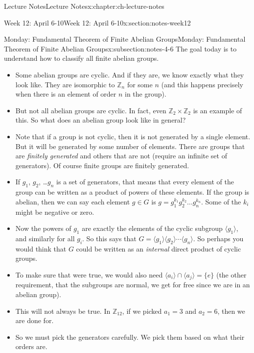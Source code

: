 \documentclass[oneside,11pt,]{book}
\begin{document}
\begin{chapterptx}{Lecture Notes}{}{Lecture Notes}{}{}{x:chapter:ch-lecture-notes}
\begin{sectionptx}{Week 12: April 6-10}{}{Week 12: April 6-10}{}{}{x:section:notes-week12}
%
%
\typeout{************************************************}
\typeout{************************************************}
%
\begin{subsectionptx}{Monday: Fundamental Theorem of Finite Abelian Groups}{}{Monday: Fundamental Theorem of Finite Abelian Groups}{}{}{x:subsection:notes-4-6}
The goal today is to understand how to classify all finite abelian groups.%
\par
%
\begin{itemize}[label=\textbullet]
\item{}Some abelian groups are cyclic. And if they are, we know exactly what they look like. They are isomorphic to \(\mathbb Z_{n}\) for some \(n\) (and this happens precisely when there is an element of order \(n\) in the group).%
\item{}But not all abelian groups are cyclic. In fact, even \(\mathbb Z_2\times \mathbb Z_2\) is an example of this. So what does an abelian group look like in general?%
\item{}Note that if a group is not cyclic, then it is not generated by a single element. But it will be generated by some number of elements. There are groups that are \emph{finitely generated} and others that are not (require an infinite set of generators). Of course finite groups are finitely generated.%
\item{}If \(g_1\), \(g_2\), …\(g_n\) is a set of generators, that means that every element of the group can be written as a product of powers of these elements. If the group is abelian, then we can say each element \(g \in G\) is \(g = g_1^{k_1}g_2^{k_2}\ldots g_n^{k_n}\). Some of the \(k_i\) might be negative or zero.%
\item{}Now the powers of \(g_1\) are exactly the elements of the cyclic subgroup \(\langle g_1\rangle\), and similarly for all \(g_i\). So this says that \(G = \langle g_1\rangle\langle g_2\rangle\cdots\langle g_n\rangle\). So perhaps you would think that \(G\) could be written as an \emph{internal} direct product of cyclic groups.%
\item{}To make sure that were true, we would also need \(\langle a_i \rangle \cap \langle a_j\rangle = \{e\}\) (the other requirement, that the subgroups are normal, we get for free since we are in an abelian group).%
\item{}This will not always be true. In \(\mathbb Z_{12}\), if we picked \(a_1 = 3\) and \(a_2 = 6\), then we are done for.%
\item{}So we must pick the generators carefully. We pick them based on what their orders are.%

\end{itemize}
\end{subsectionptx}
\end{sectionptx}
\end{chapterptx}
\end{document}

